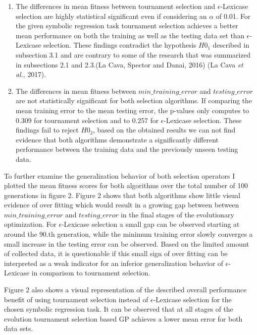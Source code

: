 \documentclass[
  12pt,
]{article}
\begin{document}
\begin{enumerate}
\def\labelenumi{\arabic{enumi}.}
\item
  The differences in mean fitness between tournament selection and
  \(\epsilon\)-Lexicase selection are highly statistical significant
  even if considering an \(\alpha\) of 0.01. For the given symbolic
  regression task tournament selection achieves a better mean
  performance on both the training as well as the testing data set than
  \(\epsilon\)-Lexicase selection. These findings contradict the
  hypothesis \(H0_{1}\) described in subsection 3.1 and are contrary to
  some of the research that was summarized in subsections 2.1 and
  2.3.(La Cava, Spector and Danai, 2016) (La Cava \emph{et al.}, 2017).
\item
  The differences in mean fitness between \(min\_training\_error\) and
  \(testing\_error\) are not statistically significant for both
  selection algorithms. If comparing the mean training error to the mean
  testing error, the p-values only computes to 0.309 for tournament
  selection and to 0.257 for \(\epsilon\)-Lexicase selection. These
  findings fail to reject \(H0_{2}\), based on the obtained results we
  can not find evidence that both algorithms demonstrate a significantly
  different performance between the training data and the previously
  unseen testing data.
\end{enumerate}

To further examine the generalization behavior of both selection
operators I plotted the mean fitness scores for both algorithms over the
total number of 100 generations in figure 2. Figure 2 shows that both
algorithms show little visual evidence of over fitting which would
result in a growing gap between between \(min\_training\_error\) and
\(testing\_error\) in the final stages of the evolutionary optimization.
For \(\epsilon\)-Lexicase selection a small gap can be observed starting
at around the 90.th generation, while the minimum training error slowly
converges a small increase in the testing error can be observed. Based
on the limited amount of collected data, it is questionable if this
small sign of over fitting can be interpreted as a weak indicator for an
inferior generalization behavior of \(\epsilon\)-Lexicase in comparison
to tournament selection.

Figure 2 also shows a visual representation of the described overall
performance benefit of using tournament selection instead of
\(\epsilon\)-Lexicase selection for the chosen symbolic regression task.
It can be observed that at all stages of the evolution tournament
selection based GP achieves a lower mean error for both data sets.
\end{document}
